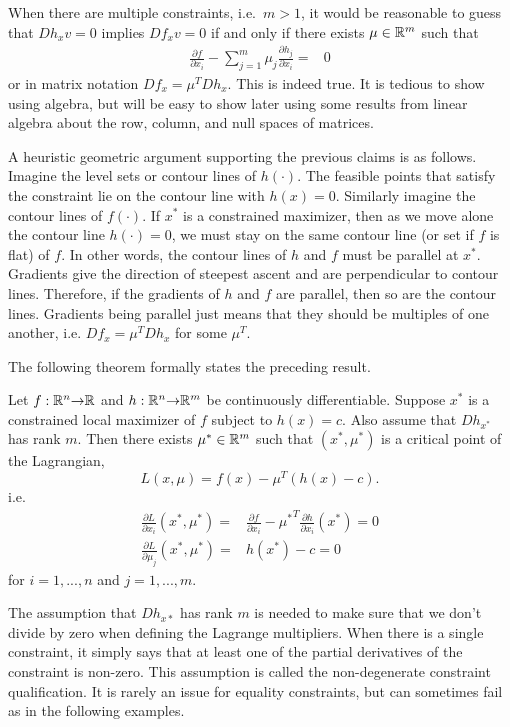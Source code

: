 When there are multiple constraints, i.e.\ $m>1$, it would be
reasonable to guess that $Dh_x v = 0$ implies $Df_x v = 0$ if and only
if there exists $\mu \in \mathbb{R}^m$ such that 
\begin{align*}
  \frac{\partial f}{\partial x_i} - \sum_{j=1}^m \mu_j  \frac{\partial
    h_j}{\partial x_i} = & 0 
\end{align*}
or in matrix notation $Df_x = \mu^T Dh_x$. This is indeed true. It is
tedious to show using algebra, but will be easy to show later using
some results from linear algebra about the row, column, and null
spaces of matrices. 

A heuristic geometric argument supporting the previous claims is as
follows. Imagine the level sets or contour lines of $h(\cdot)$. The
feasible points that satisfy the constraint lie on the contour line
with $h(x) = 0$. Similarly imagine the contour lines of $f(\cdot)$. If
$x^*$ is a constrained maximizer, then as we move alone the contour
line $h(\cdot) = 0$, we must stay on the same contour line (or set if
$f$ is flat) of $f$. In other words, the contour lines of $h$ and $f$
must be parallel at $x^*$. Gradients give the direction of steepest
ascent and are perpendicular to contour lines. Therefore, if the
gradients of $h$ and $f$ are parallel, then so are the contour
lines. Gradients being parallel just means that they should be
multiples of one another, i.e.  $Df_x = \mu^T Dh_x$ for some $\mu^T$. 

The following theorem formally states the preceding result.
\begin{theorem} \label{thm:econ} Let $f:\mathbb{R}^n {\rightarrow} \mathbb{R}$ and $h: \mathbb{R}^n {\rightarrow}
  \mathbb{R}^m$ be continuously differentiable. Suppose $x^*$ is a constrained
  local maximizer of $f$ subject to $h(x) = c$. Also assume that
  $Dh_{x^*}$ has rank $m$. Then there exists $\mu^* \in \mathbb{R}^m$ such
  that $(x^*, \mu^*)$ is a critical point of the Lagrangian,
  \[ L(x,\mu) = f(x) - \mu^T (h(x) - c). \]
  i.e.
  \begin{align*}
    \frac{\partial L}{\partial x_i}(x^*,\mu^*) = & \frac{\partial
      f}{\partial x_i} - {\mu^*}^T \frac{\partial h}{\partial
      x_i}(x^*) = 0 \\
    \frac{\partial L}{\partial \mu_j}(x^*,\mu^*) = & h(x^*) -
    c = 0
  \end{align*}
  for $i = 1, ..., n$ and $j=1,...,m$.
\end{theorem}
The assumption that $Dh_{x*}$ has rank $m$ is needed to make sure that
we don't divide by zero when defining the Lagrange multipliers. When
there is a single constraint, it simply says that at least one of the
partial derivatives of the constraint is non-zero. This assumption is
called the non-degenerate constraint qualification. It is rarely an
issue for equality constraints, but can sometimes fail as in the
following examples.

